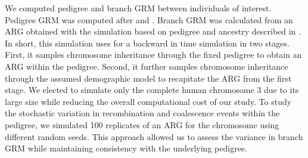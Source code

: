 \begin{table}
  \centering
  \caption{Selected regions and parishes from the BALSAC French-Canadian Pedigree}
  \renewcommand{\arraystretch}{1.2}
  \label{tab:parishes}
\end{table}

We computed pedigree and branch GRM between individuals of interest.
%
Pedigree GRM was computed after
\citet{lange1992calculation} and \citet{colleau2002indirect}.
%
Branch GRM was calculated from an ARG
obtained with the simulation based on pedigree and ancestry
described in \citet{andersontrocme2023genes}.
%
In short, this simulation uses \msprime{} \citep{baumdicker2022efficient} 
for a backward in time simulation in two stages.
%
First, it samples chromosome inheritance through the fixed pedigree
to obtain an ARG within the pedigree.
%
Second, it further samples chromosome inheritance through the assumed demographic model
to recapitate the ARG from the first stage.
%
We elected to simulate only the complete human chromosome 3 due to its large size
while reducing the overall computational cost of our study.
%
To study the stochastic variation in recombination and coalescence events within the pedigree,
we simulated 100 replicates of an ARG for the chromosome using different random seeds.
%
This approach allowed us to assess the variance in branch GRM
while maintaining consistency with the underlying pedigree.

